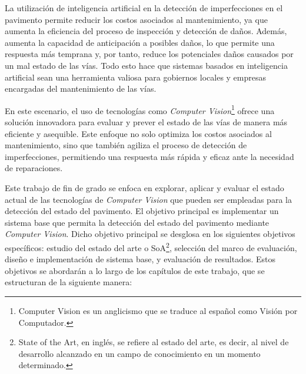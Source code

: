 La utilización de inteligencia artificial en la detección de imperfecciones en el pavimento permite reducir los costos asociados al mantenimiento, ya que aumenta la eficiencia del proceso de inspección y detección de daños. Además, aumenta la capacidad de anticipación a posibles daños, lo que permite una respuesta más temprana y, por tanto, reduce los potenciales daños causados por un mal estado de las vías. Todo esto hace que sistemas basados en inteligencia artificial sean una herramienta valiosa para gobiernos locales y empresas encargadas del mantenimiento de las vías.

En este escenario, el uso de tecnologías como \textit{Computer Vision}\footnote{Computer Vision es un anglicismo que se traduce al español como Visión por Computador.} ofrece una solución innovadora para evaluar y prever el estado de las vías de manera más eficiente y asequible. Este enfoque no solo optimiza los costos asociados al mantenimiento, sino que también agiliza el proceso de detección de imperfecciones, permitiendo una respuesta más rápida y eficaz ante la necesidad de reparaciones.

Este trabajo de fin de grado se enfoca en explorar, aplicar y evaluar el estado actual de las tecnologías de \textit{Computer Vision} que pueden ser empleadas para la detección del estado del pavimento. El objetivo principal es implementar un sistema base que permita la detección del estado del pavimento mediante \textit{Computer Vision}. Dicho objetivo principal se desglosa en los siguientes objetivos específicos: estudio del estado del arte o SoA\footnote{State of the Art, en inglés, se refiere al estado del arte, es decir, al nivel de desarrollo alcanzado en un campo de conocimiento en un momento determinado.}, selección del marco de evaluación, diseño e implementación de sistema base, y evaluación de resultados. Estos objetivos se abordarán a lo largo de los capítulos de este trabajo, que se estructuran de la siguiente manera:

